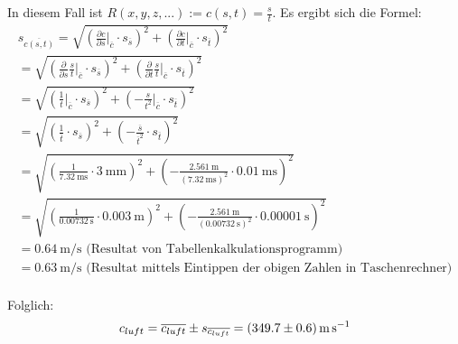 In diesem Fall ist $R(x,y,z,...) := c(s,t) = \frac{s}{t}$. Es ergibt sich die Formel:
\begin{gather*}
    s_{\overline{c(s,t)}} = \sqrt{ \left( \frac{\partial c}{\partial s} \biggr\rvert_{\overline{c}} \cdot s_{\overline{s}}\right)^2
                            + \left( \frac{\partial c}{\partial t} \biggr\rvert_{\overline{c}} \cdot s_{\overline{t}}\right)^2 } \\
                            = \sqrt{ \left( \frac{\partial}{\partial s}\frac{s}{t} \biggr\rvert_{\overline{c}} \cdot s_{\overline{s}}\right)^2
                            + \left( \frac{\partial}{\partial t}\frac{s}{t} \biggr\rvert_{\overline{c}} \cdot s_{\overline{t}}\right)^2 } \\
                            = \sqrt{ \left( \frac{1}{t} \biggr\rvert_{\overline{c}} \cdot s_{\overline{s}}\right)^2
                            + \left( - \frac{s}{t^2} \biggr\rvert_{\overline{c}} \cdot s_{\overline{t}}\right)^2 } \\
                            = \sqrt{ \left( \frac{1}{\overline{t}} \cdot s_{\overline{s}}\right)^2
                            + \left( - \frac{\overline{s}}{\overline{t}^2} \cdot s_{\overline{t}}\right)^2 } \\
                            = \sqrt{ \left( \frac{1}{\SI{7.32}{\milli\second}} \cdot \SI{3}{\milli\meter} \right)^2
                            + \left( - \frac{\SI{2.561}{\meter}}{(\SI{7.32}{\milli\second})^2} \cdot \SI{0.01}{\milli\second}\right)^2 } \\
                            = \sqrt{ \left( \frac{1}{\SI{0.00732}{\second}} \cdot \SI{0.003}{\meter} \right)^2
                            + \left( - \frac{\SI{2.561}{\meter}}{(\SI{0.00732}{\second})^2} \cdot \SI{0.00001}{\second}\right)^2 } \\
                            = \SI{0.64}{\meter\per\second} \text{ (Resultat von Tabellenkalkulationsprogramm)} \\
                            = \SI{0.63}{\meter\per\second} \text{ (Resultat mittels Eintippen der obigen Zahlen in Taschenrechner)} \\
\end{gather*}

Folglich:
\begin{equation}
    c_{luft} = \overline{c_{luft}} \pm s_{\overline{c_{luft}}} = \SI[separate-uncertainty = true]{349.7 \pm 0.6}{\meter\per\second}
\end{equation}

\clearpage

